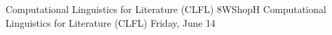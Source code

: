 \begin{wsschedule}
{Computational Linguistics for Literature (CLFL)}
{8}{WShopH}
{Computational Linguistics for Literature (CLFL)}
{Friday, June 14}{\WShopLocH}

\end{wsschedule}
